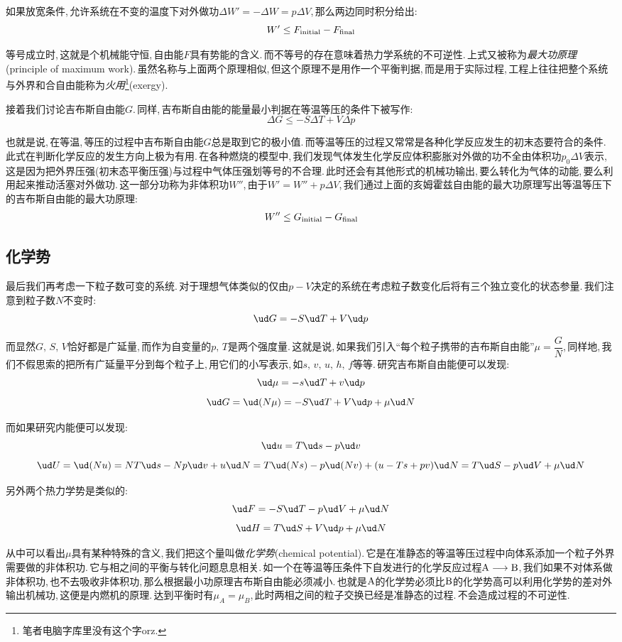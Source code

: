 如果放宽条件,\,允许系统在不变的温度下对外做功$\Delta W'=-\Delta W=p\Delta V$,\,那么两边同时积分给出:
\[W'\leq F_{\rm initial}-F_{\rm final}\]

等号成立时,\,这就是个机械能守恒,\,自由能$F$具有势能的含义.\,而不等号的存在意味着热力学系统的不可逆性.\,上式又被称为\emph{最大功原理}(principle of maximum work).\,虽然名称与上面两个原理相似,\,但这个原理不是用作一个平衡判据,\,而是用于实际过程,\,工程上往往把整个系统与外界和合自由能称为\emph{火用}\footnote{笔者电脑字库里没有这个字orz.}(exergy).

接着我们讨论吉布斯自由能$G$.\,同样,\,吉布斯自由能的能量最小判据在等温等压的条件下被写作:
\[\Delta G\leq -S\Delta T +V\Delta p\]

也就是说,\,在等温,\,等压的过程中吉布斯自由能$G$总是取到它的极小值.\,而等温等压的过程又常常是各种化学反应发生的初末态要符合的条件.\,此式在判断化学反应的发生方向上极为有用.\,在各种燃烧的模型中,\,我们发现气体发生化学反应体积膨胀对外做的功不全由体积功$p_0\Delta V$表示,\,这是因为把外界压强(初末态平衡压强)与过程中气体压强划等号的不合理.\,此时还会有其他形式的机械功输出,\,要么转化为气体的动能,\,要么利用起来推动活塞对外做功.\,这一部分功称为非体积功$W''$,\,由于$W'=W''+p\Delta V$,\,我们通过上面的亥姆霍兹自由能的最大功原理写出等温等压下的吉布斯自由能的最大功原理:
\[W''\leq G_{\rm initial}-G_{\rm final}\]

\subsection{化学势}
最后我们再考虑一下粒子数可变的系统.\,对于理想气体类似的仅由$p-V$决定的系统在考虑粒子数变化后将有三个独立变化的状态参量.\,我们注意到粒子数$N$不变时:
\[\ud G=-S\ud T+V\ud p\]

而显然$G,\,S,\,V$恰好都是广延量,\,而作为自变量的$p,\,T$是两个强度量.\,这就是说,\,如果我们引入``每个粒子携带的吉布斯自由能''$\mu=\dfrac{G}{N}$,\,同样地,\,我们不假思索的把所有广延量平分到每个粒子上,\,用它们的小写表示,\,如$s,\,v,\,u,\,h,\,f$等等.\,研究吉布斯自由能便可以发现:
\[\ud \mu=-s\ud T+v\ud p\]
\[\ud G=\ud (N\mu)=-S\ud T+V\ud p+\mu \ud N\]

而如果研究内能便可以发现:
\[\ud u=T\ud s-p\ud v\]
\[\ud U=\ud (Nu)=NT\ud s-Np\ud v+ u\ud N=T\ud (Ns)-p\ud(Nv)+(u-Ts+pv)\ud N=T\ud S-p\ud V +\mu \ud N\]

另外两个热力学势是类似的:
\[\ud F=-S\ud T-p\ud V +\mu \ud N\]
\[\ud H=T\ud S+V\ud p+\mu \ud N\]

从中可以看出$\mu$具有某种特殊的含义,\,我们把这个量叫做\emph{化学势}(chemical potential).\,它是在准静态的等温等压过程中向体系添加一个粒子外界需要做的非体积功.\,它与相之间的平衡与转化问题息息相关.\,如一个在等温等压条件下自发进行的化学反应过程${\rm A \longrightarrow B}$,\,我们如果不对体系做非体积功,\,也不去吸收非体积功,\,那么根据最小功原理吉布斯自由能必须减小.\,也就是${\rm A}$的化学势必须比${\rm B}$的化学势高可以利用化学势的差对外输出机械功,\,这便是内燃机的原理.\,达到平衡时有$\mu_A=\mu_B$,\,此时两相之间的粒子交换已经是准静态的过程.\,不会造成过程的不可逆性.

